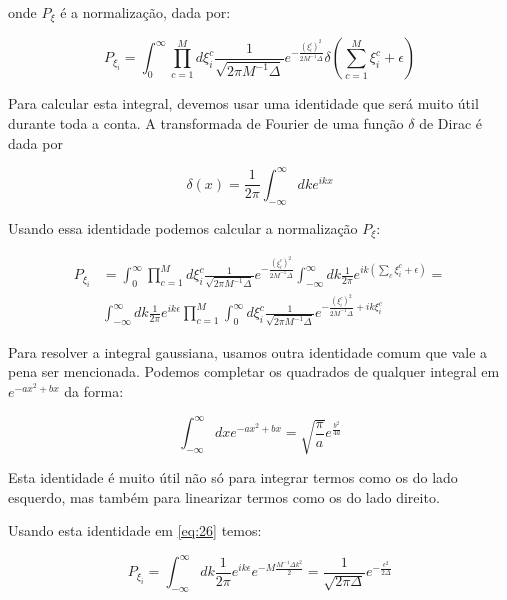 onde $P_\xi$ é a normalização, dada por:

\begin{equation}
  \label{eq:26}
  P_{\xi_i} = \int_0^\infty \prod_{c=1}^M d\xi_i^c \frac{1}{\sqrt{2\pi M^{-1}\Delta}}e^{-\frac{(\xi_i^c)^2}{2 M^{-1}\Delta}}
    \delta\left(\sum_{c=1}^M \xi_i^c + \epsilon\right)
\end{equation}

Para calcular esta integral, devemos usar uma identidade que será
muito útil durante toda a conta. A transformada de Fourier de uma
função $\delta$ de Dirac é dada por

\begin{equation}
  \label{eq:27}
  \delta(x) = \frac{1}{2\pi} \int_{-\infty}^\infty dk e^{i k x}
\end{equation}

Usando essa identidade podemos calcular a normalização $P_\xi$:

\begin{align}
  \label{eq:26}
  P_{\xi_i} & = \int_0^\infty \prod_{c=1}^M d\xi_i^c
  \frac{1}{\sqrt{2\pi M^{-1}\Delta}}e^{-\frac{(\xi_i^c)^2}{2 M^{-1}\Delta}}
  \int_{-\infty}^\infty dk \frac{1}{2\pi} e^{i k (\sum_c \xi_i^c + \epsilon)} =
  \\ & \int_{-\infty}^\infty dk \frac{1}{2\pi} e^{ik\epsilon} \prod_{c=1}^M
  \int_0^\infty d\xi_i^c \frac{1}{\sqrt{2\pi
      M^{-1}\Delta}}e^{-\frac{(\xi_i^c)^2}{2 M^{-1}\Delta} + i k \xi_i^c}
\end{align}

Para resolver a integral gaussiana, usamos outra identidade comum que
vale a pena ser mencionada. Podemos completar os quadrados de qualquer
integral em $e^{-a x^2 + bx}$ da forma:

\begin{equation}
  \label{eq:28}
  \int_{-\infty}^\infty dx e^{-ax^2 + bx} = \sqrt{\frac{\pi}{a}} e^{\frac{b^2}{4a}}
\end{equation}

Esta identidade é muito útil não só para integrar termos como os do
lado esquerdo, mas também para linearizar termos como os do lado
direito.

Usando esta identidade em \eqref{eq:26} temos:

\begin{equation}
  \label{eq:29}
  P_{\xi_i} = \int_{-\infty}^\infty dk \frac{1}{2\pi} e^{ik\epsilon} 
  e^{-M\frac{M^{-1}\Delta k^2}{2}} = \frac{1}{\sqrt{2\pi\Delta}} e^{-\frac{\epsilon^2}{2\Delta}}
\end{equation}


